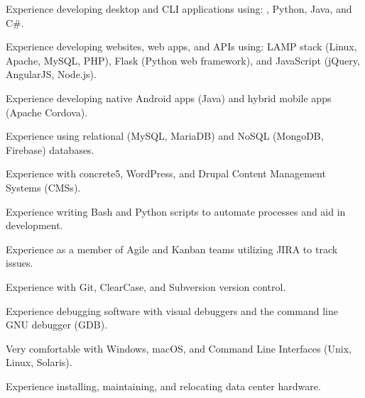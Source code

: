 \begin{itemize*}
  \item Experience developing desktop and CLI applications using: \CPP, Python, Java, and C\#.
  \item Experience developing websites, web apps, and APIs using: LAMP stack (Linux, Apache, MySQL, PHP), Flask (Python web framework), and JavaScript (jQuery, AngularJS, Node.js).
  \item Experience developing native Android apps (Java) and hybrid mobile apps (Apache Cordova).
  \item Experience using relational (MySQL, MariaDB) and NoSQL (MongoDB, Firebase) databases.
  \item Experience with concrete5, WordPress, and Drupal Content Management Systems (CMSs).
  \item Experience writing Bash and Python scripts to automate processes and aid in development.
  \item Experience as a member of Agile and Kanban teams utilizing JIRA to track issues.
  \item Experience with Git, ClearCase, and Subversion version control.
  \item Experience debugging software with visual debuggers and the command line GNU debugger (GDB).
  \item Very comfortable with Windows, macOS, and Command Line Interfaces (Unix, Linux, Solaris).
  \item Experience installing, maintaining, and relocating data center hardware.
\end{itemize*}


